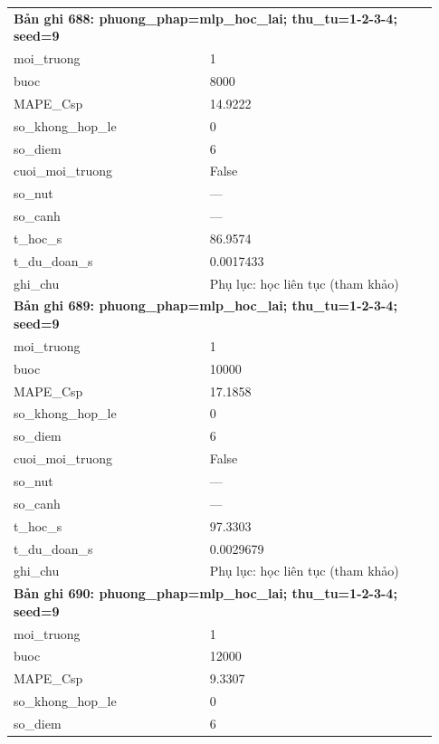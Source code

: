 \begin{longtable}{p{0.43\linewidth}p{0.50\linewidth}}
\midrule
\multicolumn{2}{p{0.95\linewidth}}{\textbf{Bản ghi 688: phuong\_phap=mlp\_hoc\_lai; thu\_tu=1-2-3-4; seed=9}} \\
moi\_\allowbreak truong & 1 \\
buoc & 8000 \\
MAPE\_\allowbreak Csp & 14.9222 \\
so\_\allowbreak khong\_\allowbreak hop\_\allowbreak le & 0 \\
so\_\allowbreak diem & 6 \\
cuoi\_\allowbreak moi\_\allowbreak truong & False \\
so\_\allowbreak nut & — \\
so\_\allowbreak canh & — \\
t\_\allowbreak hoc\_\allowbreak s & 86.9574 \\
t\_\allowbreak du\_\allowbreak doan\_\allowbreak s & 0.0017433 \\
ghi\_\allowbreak chu & Phụ lục: học liên tục (tham khảo) \\
\midrule
\multicolumn{2}{p{0.95\linewidth}}{\textbf{Bản ghi 689: phuong\_phap=mlp\_hoc\_lai; thu\_tu=1-2-3-4; seed=9}} \\
moi\_\allowbreak truong & 1 \\
buoc & 10000 \\
MAPE\_\allowbreak Csp & 17.1858 \\
so\_\allowbreak khong\_\allowbreak hop\_\allowbreak le & 0 \\
so\_\allowbreak diem & 6 \\
cuoi\_\allowbreak moi\_\allowbreak truong & False \\
so\_\allowbreak nut & — \\
so\_\allowbreak canh & — \\
t\_\allowbreak hoc\_\allowbreak s & 97.3303 \\
t\_\allowbreak du\_\allowbreak doan\_\allowbreak s & 0.0029679 \\
ghi\_\allowbreak chu & Phụ lục: học liên tục (tham khảo) \\
\midrule
\multicolumn{2}{p{0.95\linewidth}}{\textbf{Bản ghi 690: phuong\_phap=mlp\_hoc\_lai; thu\_tu=1-2-3-4; seed=9}} \\
moi\_\allowbreak truong & 1 \\
buoc & 12000 \\
MAPE\_\allowbreak Csp & 9.3307 \\
so\_\allowbreak khong\_\allowbreak hop\_\allowbreak le & 0 \\
so\_\allowbreak diem & 6 \\

\end{longtable}
